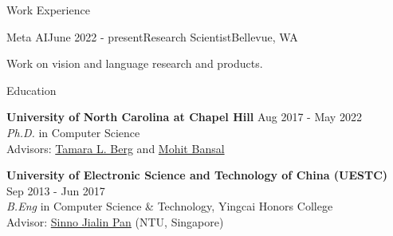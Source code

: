 \documentclass{resume} %
\begin{document}

\begin{rSection}{Work Experience}


    \begin{rSubsection}{Meta AI}{June 2022 - present}{Research Scientist}{Bellevue, WA}
        \item Work on vision and language research and products.
    \end{rSubsection}

    \end{rSection}


\begin{rSection}{Education}

{\bf University of North Carolina at Chapel Hill} \hfill {Aug 2017  -  May 2022} \\
{\sl Ph.D.} in Computer Science \\
Advisors: \href{http://www.tamaraberg.com/}{Tamara L. Berg} and \href{http://www.cs.unc.edu/~mbansal/}{Mohit Bansal}

{\bf University of Electronic Science and Technology of China (UESTC)} \hfill {Sep 2013 - Jun 2017} \\
{\sl B.Eng} in Computer Science \& Technology, Yingcai Honors College\\
Advisor: \href{https://personal.ntu.edu.sg/sinnopan/}{Sinno Jialin Pan} (NTU, Singapore)
\end{rSection}

\end{document}
